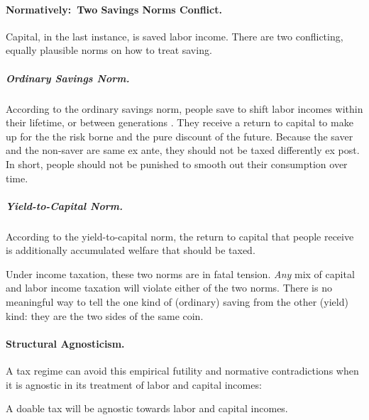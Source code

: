 \paragraph{Normatively:~Two Savings Norms Conflict.}
	\label{sec:savings-norms}
Capital, in the last instance, is saved labor income.
There are two conflicting, equally plausible norms on how to treat saving.

\subparagraph{Ordinary Savings Norm.}
	\label{sec:OSN}
According to the ordinary savings norm, people save to shift labor incomes within their lifetime, or between generations \citep[819]{McCaffery2005}.
They receive a return to capital to make up for the the risk borne and the pure discount of the future.
Because the saver and the non-saver are same ex ante, they should not be taxed differently ex post.
In short, people should not be punished to smooth out their consumption over time.

\subparagraph{Yield-to-Capital Norm.}
	\label{sec:Y2C}
According to the yield-to-capital norm, the return to capital that people receive is additionally accumulated welfare that should be taxed.

Under income taxation, these two norms are in fatal tension.
\emph{Any} mix of capital and labor income taxation will violate either of the two norms.
There is no meaningful way to tell the one kind of (ordinary) saving from the other (yield) kind:
they are the two sides of the same coin.


\paragraph{Structural Agnosticism.}
A tax regime can avoid this empirical futility and normative contradictions when it is agnostic in its treatment of labor and capital incomes:

\begin{desideratum}
	\label{des:structural-agnosticism}
	A doable tax will be agnostic towards labor and capital incomes.
\end{desideratum}

